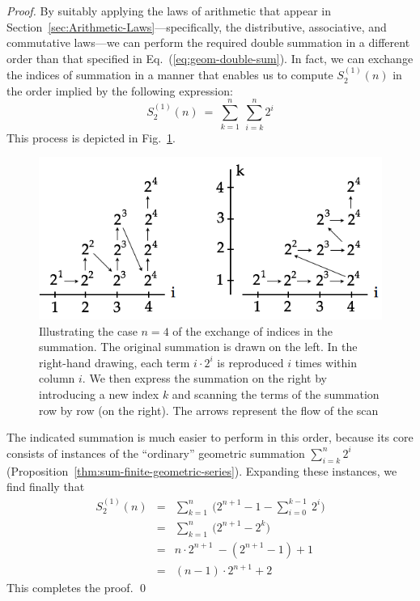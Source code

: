 \begin{proof}
By suitably applying the laws of arithmetic that appear in Section~\ref{sec:Arithmetic-Laws}---specifically, the distributive, associative, and commutative laws---we can perform the required double summation in a different order than that specified in Eq.~(\ref{eq:geom-double-sum}).  In fact, we can exchange the indices of summation in a manner that enables us to compute $S_2^{(1)}(n)$ in the order implied by the following expression:
\[
S_2^{(1)}(n) \ = \ \sum_{k=1}^{n} \ \sum_{i=k}^{n} 2^i
\]
This process is depicted in Fig.~\ref{fig:Sumi2i}.
\begin{figure}[htb]
\centerline{
\includegraphics[scale=0.35]{FiguresMaths/Sumi2i}
}
\caption{Illustrating the case $n=4$ of the exchange of indices in the summation.  The original summation is drawn on the left.  In the right-hand drawing, each term $i \cdot 2^i$ is reproduced $i$ times within column $i$.  We then express the summation on the right by introducing a new index $k$ and scanning the terms of the summation row by row (on the right).  The arrows represent the flow of the scan}
\label{fig:Sumi2i}
\end{figure}
The indicated summation is much easier to perform in this order, because its core consists of instances of the ``ordinary'' geometric summation $\sum_{i=k}^{n} 2^i$ (Proposition~\ref{thm:sum-finite-geometric-series}).  Expanding these instances, we find finally that
\begin{eqnarray*}
S_2^{(1)}(n)
  & = &
\sum_{k=1}^{n} \ \big( 2^{n+1} -1 - \sum_{i=0}^{k-1} \ 2^i \big) \\
  & = &
\sum_{k=1}^{n} \ \big( 2^{n+1} - 2^k \big) \\
  & = &
n \cdot 2^{n+1}\ - ( 2^{n+1} -1) +1 \\
  & = &
(n-1) \cdot 2^{n+1} +2
\end{eqnarray*}
This completes the proof.  \qed
\end{proof}

